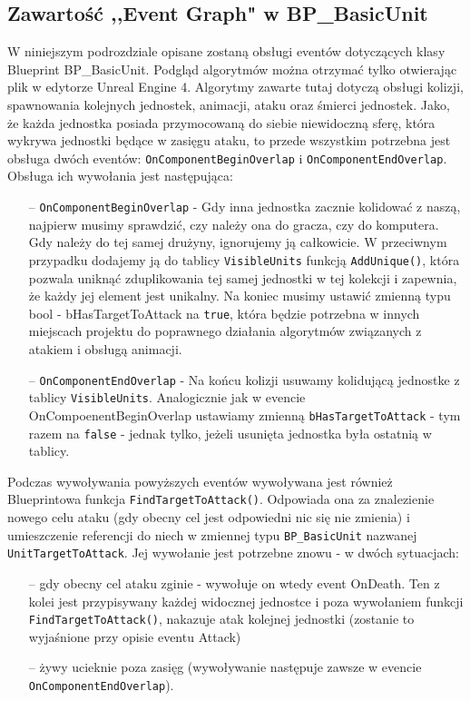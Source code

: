 \documentclass[12pt]{report}
\begin{document}
\subsection{Zawartość ,,Event Graph" w BP\_BasicUnit}
W niniejszym podrozdziale opisane zostaną obsługi eventów dotyczących klasy Blueprint BP\_BasicUnit. Podgląd algorytmów można otrzymać tylko otwierając plik w edytorze Unreal Engine 4. Algorytmy zawarte tutaj dotyczą obsługi kolizji, spawnowania kolejnych jednostek, animacji, ataku oraz śmierci jednostek. Jako, że każda jednostka posiada przymocowaną do siebie niewidoczną sferę, która wykrywa jednostki będące w zasięgu ataku, to przede wszystkim potrzebna jest obsługa dwóch eventów: \texttt{OnComponentBeginOverlap} i \texttt{OnComponentEndOverlap}. Obsługa ich wywołania jest następująca:
\begin{itemize}
\item[--] \texttt{OnComponentBeginOverlap} - Gdy inna jednostka zacznie kolidować z naszą, najpierw musimy sprawdzić, czy należy ona do gracza, czy do komputera. Gdy należy do tej samej drużyny, ignorujemy ją całkowicie. W przeciwnym przypadku dodajemy ją do tablicy \texttt{VisibleUnits} funkcją \texttt{AddUnique()}, która pozwala uniknąć zduplikowania tej samej jednostki w tej kolekcji i zapewnia, że każdy jej element jest unikalny. Na koniec musimy ustawić zmienną typu bool - bHasTargetToAttack na \texttt{true}, która będzie potrzebna w innych miejscach projektu do poprawnego działania algorytmów związanych z atakiem i obsługą animacji.
\item[--] \texttt{OnComponentEndOverlap} - Na końcu kolizji usuwamy kolidującą jednostke z tablicy \texttt{VisibleUnits}. Analogicznie jak w evencie OnCompoenentBeginOverlap ustawiamy zmienną \texttt{bHasTargetToAttack} - tym razem na \texttt{false} - jednak tylko, jeżeli usunięta jednostka była ostatnią w tablicy.
\end{itemize}

Podczas wywoływania powyższych eventów wywoływana jest również Blueprintowa funkcja \texttt{FindTargetToAttack()}. Odpowiada ona za znalezienie nowego celu ataku (gdy obecny cel jest odpowiedni nic się nie zmienia) i umieszczenie referencji do niech w zmiennej typu \texttt{BP\_BasicUnit} nazwanej \texttt{UnitTargetToAttack}. Jej wywołanie jest potrzebne znowu - w dwóch sytuacjach:
\begin{itemize}
\item[--] gdy obecny cel ataku zginie - wywołuje on wtedy event OnDeath. Ten z kolei jest przypisywany każdej widocznej jednostce i poza wywołaniem funkcji \texttt{FindTargetToAttack()}, nakazuje atak kolejnej jednostki (zostanie to wyjaśnione przy opisie eventu Attack)
\item[--] żywy ucieknie poza zasięg (wywoływanie następuje zawsze w evencie \texttt{OnComponentEndOverlap}).
\end{itemize}
\end{document}
